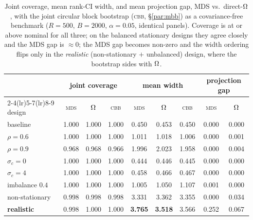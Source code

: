 \begin{table}[htb]
  \centering
  \caption[Monte Carlo coverage and width]{Joint coverage, mean rank-CI width, and
  mean projection gap, MDS vs.\ direct-$\Omega$, with the joint circular block
  bootstrap (\textsc{cbb}, \S\ref{par:mbb}) as a covariance-free benchmark ($R=500$,
  $B=2000$, $\alpha=0.05$, identical panels). Coverage is at or above nominal for all three;
  on the balanced stationary designs they agree closely and the MDS gap is $\approx 0$;
  the MDS gap becomes non-zero and the width ordering flips only in the
  \emph{realistic} (non-stationary $+$ unbalanced) design,
  where the bootstrap sides with $\Omega$.}
  \label{tab:mc-coverage}
  \small
  \begin{tabular}{lcccccccc}
    \toprule
    & \multicolumn{3}{c}{joint coverage} & \multicolumn{3}{c}{mean width}
    & \multicolumn{2}{c}{projection gap}\\
    \cmidrule(lr){2-4}\cmidrule(lr){5-7}\cmidrule(lr){8-9}
    design & \textsc{mds} & $\Omega$ & \textsc{cbb} & \textsc{mds} & $\Omega$
    & \textsc{cbb} & \textsc{mds} & $\Omega$\\
    \midrule
    baseline & 1.000 & 1.000 & 1.000 & 0.450 & 0.453 & 0.450 & 0.000 & 0.000\\
    $\rho=0.6$ & 1.000 & 1.000 & 1.000 & 1.011 & 1.018 & 1.006 & 0.000 & 0.001\\
    $\rho=0.9$ & 0.968 & 0.968 & 0.966 & 1.996 & 2.023 & 1.958 & 0.000 & 0.004\\
    $\sigma_c=0$ & 1.000 & 1.000 & 1.000 & 0.444 & 0.446 & 0.445 & 0.000 & 0.000\\
    $\sigma_c=4$ & 1.000 & 1.000 & 1.000 & 0.458 & 0.466 & 0.467 & 0.000 & 0.000\\
    imbalance $0.4$ & 1.000 & 1.000 & 1.000 & 1.005 & 1.050 & 1.107 & 0.001 & 0.000\\
    non-stationary & 0.998 & 0.998 & 0.998 & 3.331 & 3.362 & 3.355 & 0.000 & 0.034\\
    \textbf{realistic} & 0.998 & 1.000 & 1.000 & \textbf{3.765} & \textbf{3.518} & 3.566 & 0.252 & 0.067\\
    \bottomrule
  \end{tabular}
\end{table}
